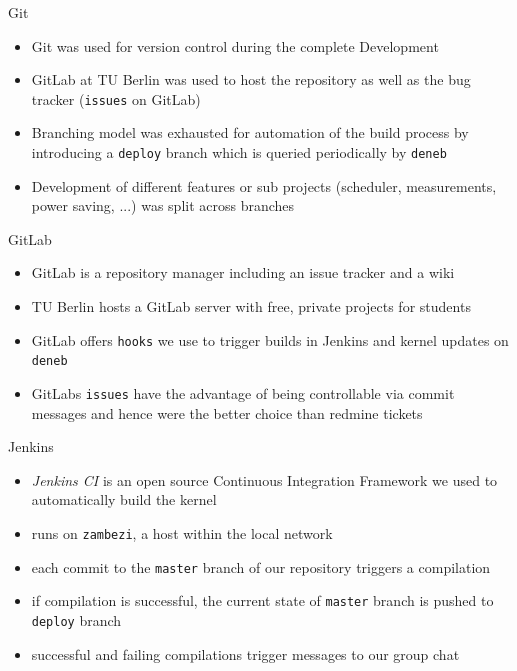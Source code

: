 
\begin{frame}{Git}    
    \begin{itemize}
        \item Git was used for version control during the complete Development
        \item GitLab at TU Berlin was used to host the repository as well as the bug tracker (\texttt{issues} on GitLab)
        \item Branching model was exhausted for automation of the build process by introducing a \texttt{deploy} branch which is queried periodically by \texttt{deneb}
        \item Development of different features or sub projects (scheduler, measurements, power saving, ...) was split across branches
    \end{itemize}
\end{frame}

\begin{frame}{GitLab}
	\begin{itemize}
		\item GitLab is a repository manager including an issue tracker and a wiki
		\item TU Berlin hosts a GitLab server with free, private projects for students
		\item GitLab offers \texttt{hooks} we use to trigger builds in Jenkins and kernel updates on \texttt{deneb}
		\item GitLabs \texttt{issues} have the advantage of being controllable via commit messages and hence were the better choice than redmine tickets
	\end{itemize}
\end{frame}

\begin{frame}{Jenkins}
	\begin{itemize}
		\item \textit{Jenkins CI} is an open source Continuous Integration Framework we used to automatically build the kernel
		\item runs on \texttt{zambezi}, a host within the local network
		\item each commit to the \texttt{master} branch of our repository triggers a compilation
		\item if compilation is successful, the current state of \texttt{master} branch is pushed to \texttt{deploy} branch
		\item successful and failing compilations trigger messages to our group chat
	\end{itemize}
\end{frame}

